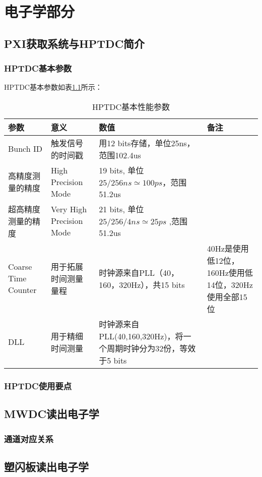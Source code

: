 \chapter{电子学部分}
\section{PXI获取系统与HPTDC简介}

\subsection{HPTDC基本参数}
HPTDC基本参数如表\ref{tbl:hptdc_parameters}所示：
\begin{table}
	\centering
		\begin{tabular}{|l|l|l|p{6cm}|}
			\hline
			参数 & 意义 & 数值 & 备注 \\ 
			\hline
			Bunch ID & 触发信号的时间戳 & 用12 bits存储，单位25ns，范围102.4us &  \\ 
			\hline
			高精度测量的精度 & High Precision Mode & 19 bits, 单位$25/256 ns\simeq 100 ps$，范围51.2us &  \\ 
			\hline
			超高精度测量的精度 & Very High Precision Mode & 21 bits, 单位$25/256/4 ns \simeq 25 ps$ ,范围51.2us & \\
			\hline
			Coarse Time Counter & 用于拓展时间测量量程 & 时钟源来自PLL（40，160，320Hz），共15 bits & 40Hz是使用低12位，160Hz使用低14位，320Hz使用全部15位 \\
			\hline
			DLL & 用于精细时间测量 & 时钟源来自PLL(40,160,320Hz)，将一个周期时钟分为32份，等效于5 bits & \\
			\hline
		\end{tabular}
		\caption{HPTDC基本性能参数}
		\label{tbl:hptdc_parameters}
\end{table}

\subsection{HPTDC使用要点}

\section{MWDC读出电子学}

\subsection{通道对应关系}

\section{塑闪板读出电子学}

